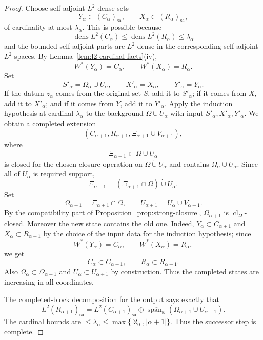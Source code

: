 \documentclass[11pt,letterpaper,reqno]{amsart}
\theoremstyle{definition}
\numberwithin{equation}{section}
\newcommand{\sa}{\mathrm{sa}}
\newcommand{\RR}{\mathbb R}
\newcommand{\cl}{\operatorname{cl}}
\DeclareMathOperator{\spanop}{span}
\DeclareMathOperator{\dens}{dens}
\begin{document}
\begin{proof}
Choose self-adjoint \(L^2\)-dense sets
\[
   Y_\alpha\subset (C_\alpha)_{\sa},
   \qquad
   X_\alpha\subset (R_\alpha)_{\sa},
\]
of cardinality at most \(\lambda_\alpha\).  This is possible because
\[
   \dens L^2(C_\alpha)\leq \dens L^2(R_\alpha)\leq\lambda_\alpha
\]
and the bounded self-adjoint parts are \(L^2\)-dense in the corresponding
self-adjoint \(L^2\)-spaces.  By Lemma~\ref{lem:l2-cardinal-facts}(iv),
\[
   W^*(Y_\alpha)=C_\alpha,
   \qquad
   W^*(X_\alpha)=R_\alpha.
\]
Set
\[
   S'_\alpha=\Omega_\alpha\cup U_\alpha,
   \qquad X'_\alpha=X_\alpha,
   \qquad Y'_\alpha=Y_\alpha.
\]
If the datum $z_\alpha$ comes from the original set $S$, add it to $S'_\alpha$; if it comes from $X$, add it to $X'_\alpha$; and if it comes from $Y$, add it to $Y'_\alpha$.  Apply the induction hypothesis at cardinal $\lambda_\alpha$ to the background $\Omega\dot\cup U_\alpha$ with input $S'_\alpha,X'_\alpha,Y'_\alpha$.  We obtain a completed extension
\[
   (C_{\alpha+1},R_{\alpha+1},\Xi_{\alpha+1}\cup V_{\alpha+1}),
\]
where
\[
   \Xi_{\alpha+1}\subset\Omega\dot\cup U_\alpha
\]
is closed for the chosen closure operation on $\Omega\dot\cup U_\alpha$ and contains $\Omega_\alpha\cup U_\alpha$.  Since all of $U_\alpha$ is required support,
\[
   \Xi_{\alpha+1}=(\Xi_{\alpha+1}\cap\Omega)\dot\cup U_\alpha.
\]
Set
\[
   \Omega_{\alpha+1}=\Xi_{\alpha+1}\cap\Omega,
   \qquad
   U_{\alpha+1}=U_\alpha\cup V_{\alpha+1}.
\]
By the compatibility part of Proposition~\ref{prop:strong-closure},
\(\Omega_{\alpha+1}\) is \(\cl_\Omega\)-closed.  Moreover the new state
contains the old one.  Indeed, \(Y_\alpha\subset C_{\alpha+1}\) and
\(X_\alpha\subset R_{\alpha+1}\) by the choice of the input data for the
induction hypothesis; since
\[
   W^*(Y_\alpha)=C_\alpha,
   \qquad
   W^*(X_\alpha)=R_\alpha,
\]
we get
\[
   C_\alpha\subset C_{\alpha+1},
   \qquad
   R_\alpha\subset R_{\alpha+1}.
\]
Also \(\Omega_\alpha\subset\Omega_{\alpha+1}\) and
\(U_\alpha\subset U_{\alpha+1}\) by construction.  Thus the completed states
are increasing in all coordinates.

The completed-block decomposition for the output says exactly that
\[
   L^2(R_{\alpha+1})_{\sa}=L^2(C_{\alpha+1})_{\sa}\oplus
   \overline{\spanop_{\RR}}(\Omega_{\alpha+1}\cup U_{\alpha+1}).
\]
The cardinal bounds are $\leq\lambda_\alpha\leq\max\{\aleph_0,|\alpha+1|\}$.  Thus the successor step is complete.


\end{proof}
\end{document}
